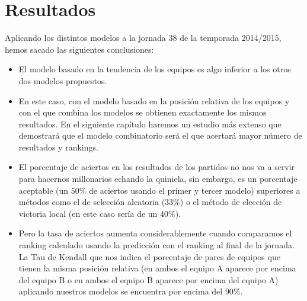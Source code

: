 \section{Resultados}
Aplicando los distintos modelos a la jornada 38 de la temporada 2014/2015, hemos sacado las siguientes conclusiones:
\begin{itemize}
	\item El modelo basado en la tendencia de los equipos es algo inferior a los otros dos modelos propuestos.
	\item En este caso, con el modelo basado en la posición relativa de los equipos y con el que combina los modelos se obtienen exactamente los mismos resultados. En el siguiente capítulo haremos un estudio más extenso que demostrará que el modelo combinatorio será el que acertará mayor número de resultados y rankings.
	\item El porcentaje de aciertos en los resultados de los partidos no nos va a servir para hacernos millonarios echando la quiniela, sin embargo, es un porcentaje aceptable (un $50\%$ de aciertos usando el primer y tercer modelo) superiores a métodos como el de selección aleatoria ($33 \%$) o el método de elección de victoria local (en este caso sería de un $40\%$).
	\item Pero la tasa de aciertos aumenta considerablemente cuando comparamos el ranking calculado usando la predicción con el ranking al final de la jornada. La Tau de Kendall que nos indica el porcentaje de pares de equipos que tienen la misma posición relativa (en ambos el equipo A aparece por encima del equipo B o en ambos el equipo B aparece por encima del equipo A) aplicando nuestros modelos se encuentra por encima del $90\%$.
\end{itemize}
 
